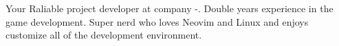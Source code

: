 

\begin{cvparagraph}
	Your Raliable project developer at company -. Double years experience in the game development. Super nerd who loves Neovim and Linux and enjoys customize all of the development environment.
\end{cvparagraph}
